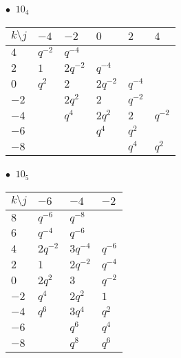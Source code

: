 %
\begin{minipage}{\linewidth}
$\bullet\ $ $10_{4}$ \vspace{0.5em} \\
\begin{tabular}{l|lllll}
$k \setminus j$ & $-4$ & $-2$ & $0$ & $2$ & $4$ \\
\hline
$4$ & $q^{-2}$ & $q^{-4}$ &  &  &  \\
$2$ & $1$ & $2q^{-2}$ & $q^{-4}$ &  &  \\
$0$ & $q^{2}$ & $2$ & $2q^{-2}$ & $q^{-4}$ &  \\
$-2$ &  & $2q^{2}$ & $2$ & $q^{-2}$ &  \\
$-4$ &  & $q^{4}$ & $2q^{2}$ & $2$ & $q^{-2}$ \\
$-6$ &  &  & $q^{4}$ & $q^{2}$ &  \\
$-8$ &  &  &  & $q^{4}$ & $q^{2}$ \\
\end{tabular}
\vspace{2em}
\end{minipage}
%
\begin{minipage}{\linewidth}
$\bullet\ $ $10_{5}$ \vspace{0.5em} \\
\begin{tabular}{l|lll}
$k \setminus j$ & $-6$ & $-4$ & $-2$ \\
\hline
$8$ & $q^{-6}$ & $q^{-8}$ &  \\
$6$ & $q^{-4}$ & $q^{-6}$ &  \\
$4$ & $2q^{-2}$ & $3q^{-4}$ & $q^{-6}$ \\
$2$ & $1$ & $2q^{-2}$ & $q^{-4}$ \\
$0$ & $2q^{2}$ & $3$ & $q^{-2}$ \\
$-2$ & $q^{4}$ & $2q^{2}$ & $1$ \\
$-4$ & $q^{6}$ & $3q^{4}$ & $q^{2}$ \\
$-6$ &  & $q^{6}$ & $q^{4}$ \\
$-8$ &  & $q^{8}$ & $q^{6}$ \\
\end{tabular}
\vspace{2em}
\end{minipage}
%
